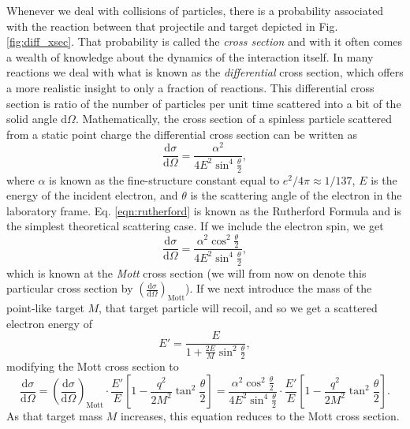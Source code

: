 Whenever we deal with collisions of particles, there is a probability associated with the reaction between that projectile and target depicted in Fig. \ref{fig:diff_xsec}. That probability is called the \textit{cross section} and with it often comes a wealth of knowledge about the dynamics of the interaction itself. In many reactions we deal with what is known as the \textit{differential} cross section, which offers a more realistic insight to only a fraction of reactions. This differential cross section is ratio of the number of particles per unit time scattered into a bit of the solid angle $\mathrm{d}\Omega$. Mathematically, the cross section of a spinless particle scattered from a static point charge the differential cross section can be written as 
\begin{equation}
\label{eqn:rutherford}
\frac{\mathrm{d}\sigma}{\mathrm{d}\Omega} = \frac{\alpha^2}{4E^2\sin^4 \frac{\theta}{2}},
\end{equation}
where $\alpha$ is known as the fine-structure constant equal to $e^2/4\pi \approx 1/137$, $E$ is the energy of the incident electron, and $\theta$ is the scattering angle of the electron in the laboratory frame. Eq. \ref{eqn:rutherford} is known as the Rutherford Formula and is the simplest theoretical scattering case. If we include the electron spin, we get
\begin{equation}
\label{eqn:mott}
\frac{\mathrm{d}\sigma}{\mathrm{d}\Omega} = \frac{\alpha^2 \cos^2 \frac{\theta}{2}}{4E^2\sin^4 \frac{\theta}{2}},
\end{equation}
which is known at the \textit{Mott} cross section (we will from now on denote this particular cross section by $\left( \tfrac{\mathrm{d}\sigma}{\mathrm{d}\Omega} \right)_{\mathrm{Mott}}$). If we next introduce the mass of the point-like target $M$, that target particle will recoil, and so we get a scattered electron energy of 
\begin{equation}
E' = \frac{E}{1+\frac{2E}{M}\sin^2 \frac{\theta}{2}},
\end{equation}
modifying the Mott cross section to
\begin{equation}
\frac{\mathrm{d}\sigma}{\mathrm{d}\Omega} = \left( \frac{\mathrm{d}\sigma}{\mathrm{d}\Omega} \right)_{\mathrm{Mott}} \cdot \frac{E'}{E} \left[ 1-\frac{q^2}{2M^2}\tan^2 \frac{\theta}{2} \right] = \frac{\alpha^2 \cos^2 \frac{\theta}{2}}{4E^2\sin^4 \frac{\theta}{2}} \cdot \frac{E'}{E} \left[ 1-\frac{q^2}{2M^2}\tan^2 \frac{\theta}{2} \right].
\end{equation}
As that target mass $M$ increases, this equation reduces to the Mott cross section. 

